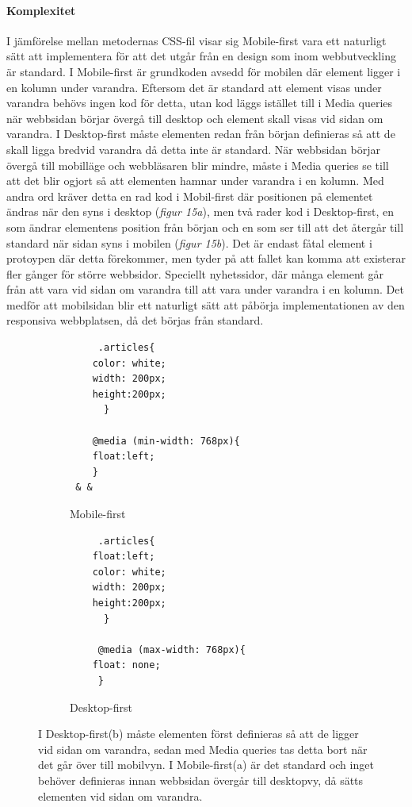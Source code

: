 \documentclass[11pt]{article}
\begin{document}
\paragraph{Komplexitet}\mbox{}

I jämförelse mellan metodernas CSS-fil visar sig Mobile-first vara ett naturligt sätt att implementera för att det utgår från en design som inom webbutveckling är standard. I Mobile-first är grundkoden avsedd för mobilen där element ligger i en kolumn under varandra. Eftersom det är standard att element visas under varandra behövs ingen kod för detta, utan kod läggs istället till i Media queries när webbsidan börjar övergå till desktop och element skall visas vid sidan om varandra. I Desktop-first måste elementen redan från början definieras så att de skall ligga bredvid varandra då detta inte är standard. När webbsidan börjar övergå till mobilläge och webbläsaren blir mindre, måste i Media queries se till att det blir ogjort så att elementen hamnar under varandra i en kolumn. Med andra ord kräver detta en rad kod i Mobil-first där positionen på elementet ändras när den syns i desktop (\textit{figur 15a}), men två rader kod i Desktop-first, en som ändrar elementens position från början och en som ser till att det återgår till standard när sidan syns i mobilen (\textit{figur 15b}). Det är endast fåtal element i protoypen där detta förekommer, men tyder på att fallet kan komma att existerar fler gånger för större webbsidor. Speciellt nyhetssidor, där många element går från att vara vid sidan om varandra till att vara under varandra i en kolumn. Det medför att mobilsidan blir ett naturligt sätt att påbörja implementationen av den responsiva webbplatsen, då det börjas från standard. 

\setcounter{figure}{14}
\begin{figure}[H]
  \begin{subfigure}[b]{.5\linewidth }

    \begin{lstlisting}
     .articles{
	color: white;
	width: 200px;
	height:200px;
      }

    @media (min-width: 768px){
	float:left;
    }
 & &
    \end{lstlisting}
    \caption{Mobile-first}
    \end{subfigure}
    \begin{subfigure}[b]{.5\linewidth}
	\begin{lstlisting}
     .articles{
	float:left;
	color: white;
	width: 200px;
	height:200px;
      }

     @media (max-width: 768px){
	float: none;  
     }
	\end{lstlisting}
    \caption{Desktop-first}
  \end{subfigure}
  \caption{I Desktop-first(b) måste elementen först definieras så att de ligger vid sidan om varandra, sedan med Media queries tas detta bort när det går över till mobilvyn. I Mobile-first(a) är det standard och inget behöver definieras innan webbsidan övergår till desktopvy, då sätts elementen vid sidan om varandra.}
\end{figure}
\newpage
\end{document}
